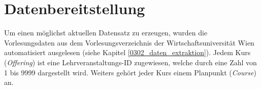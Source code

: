 \section{Datenbereitstellung}\label{chap:datenbereitstellung}


Um einen möglichst aktuellen Datensatz zu erzeugen, wurden die Vorlesungsdaten aus dem Vorlesungsverzeichnis der Wirtschaftsuniversität Wien \cite{vvz-wu} automatisiert ausgelesen (siehe Kapitel \ref{0302_daten_extraktion}). Jedem Kurs (\textit{Offering}) ist eine Lehrveranstaltungs-ID zugewiesen, welche durch eine Zahl von 1 bis 9999 dargestellt wird. Weiters gehört jeder Kurs einem Planpunkt (\textit{Course}) an.



\newpage


\newpage






